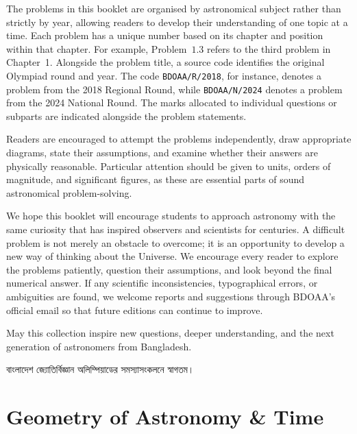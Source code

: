 \documentclass[10pt,a5paper,twoside]{article}
\newcounter{problem}[section]
\begin{document}
The problems in this booklet are organised by astronomical subject rather than strictly by year, allowing readers to develop their understanding of one topic at a time. Each problem has a unique number based on its chapter and position within that chapter. For example, Problem~$1.3$ refers to the third problem in Chapter~1. Alongside the problem title, a source code identifies the original Olympiad round and year. The code \texttt{BDOAA/R/2018}, for instance, denotes a problem from the 2018 Regional Round, while \texttt{BDOAA/N/2024} denotes a problem from the 2024 National Round. The marks allocated to individual questions or subparts are indicated alongside the problem statements.

Readers are encouraged to attempt the problems independently, draw appropriate diagrams, state their assumptions, and examine whether their answers are physically reasonable. Particular attention should be given to units, orders of magnitude, and significant figures, as these are essential parts of sound astronomical problem-solving.

We hope this booklet will encourage students to approach astronomy with the same curiosity that has inspired observers and scientists for centuries. A difficult problem is not merely an obstacle to overcome; it is an opportunity to develop a new way of thinking about the Universe. We encourage every reader to explore the problems patiently, question their assumptions, and look beyond the final numerical answer. If any scientific inconsistencies, typographical errors, or ambiguities are found, we welcome reports and suggestions through BDOAA's official email so that future editions can continue to improve.

May this collection inspire new questions, deeper understanding, and the next generation of astronomers from Bangladesh.



\vspace{0.5cm}

বাংলাদেশ জ্যোতির্বিজ্ঞান অলিম্পিয়াডের
সমস্যাসংকলনে স্বাগতম।

\clearpage


\pagestyle{bdoaa}

\section{Geometry of Astronomy \& Time }
\end{document}
